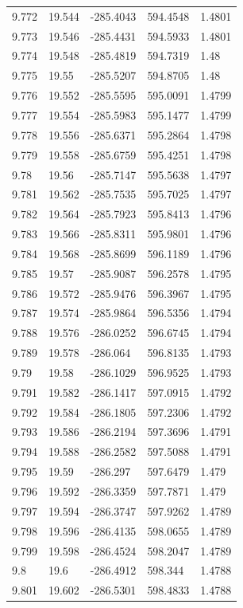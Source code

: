 \begin{tabular}{lllll}
9.772 & 19.544 & -285.4043 & 594.4548 & 1.4801 \\
9.773 & 19.546 & -285.4431 & 594.5933 & 1.4801 \\
9.774 & 19.548 & -285.4819 & 594.7319 & 1.48 \\
9.775 & 19.55 & -285.5207 & 594.8705 & 1.48 \\
9.776 & 19.552 & -285.5595 & 595.0091 & 1.4799 \\
9.777 & 19.554 & -285.5983 & 595.1477 & 1.4799 \\
9.778 & 19.556 & -285.6371 & 595.2864 & 1.4798 \\
9.779 & 19.558 & -285.6759 & 595.4251 & 1.4798 \\
9.78 & 19.56 & -285.7147 & 595.5638 & 1.4797 \\
9.781 & 19.562 & -285.7535 & 595.7025 & 1.4797 \\
9.782 & 19.564 & -285.7923 & 595.8413 & 1.4796 \\
9.783 & 19.566 & -285.8311 & 595.9801 & 1.4796 \\
9.784 & 19.568 & -285.8699 & 596.1189 & 1.4796 \\
9.785 & 19.57 & -285.9087 & 596.2578 & 1.4795 \\
9.786 & 19.572 & -285.9476 & 596.3967 & 1.4795 \\
9.787 & 19.574 & -285.9864 & 596.5356 & 1.4794 \\
9.788 & 19.576 & -286.0252 & 596.6745 & 1.4794 \\
9.789 & 19.578 & -286.064 & 596.8135 & 1.4793 \\
9.79 & 19.58 & -286.1029 & 596.9525 & 1.4793 \\
9.791 & 19.582 & -286.1417 & 597.0915 & 1.4792 \\
9.792 & 19.584 & -286.1805 & 597.2306 & 1.4792 \\
9.793 & 19.586 & -286.2194 & 597.3696 & 1.4791 \\
9.794 & 19.588 & -286.2582 & 597.5088 & 1.4791 \\
9.795 & 19.59 & -286.297 & 597.6479 & 1.479 \\
9.796 & 19.592 & -286.3359 & 597.7871 & 1.479 \\
9.797 & 19.594 & -286.3747 & 597.9262 & 1.4789 \\
9.798 & 19.596 & -286.4135 & 598.0655 & 1.4789 \\
9.799 & 19.598 & -286.4524 & 598.2047 & 1.4789 \\
9.8 & 19.6 & -286.4912 & 598.344 & 1.4788 \\
9.801 & 19.602 & -286.5301 & 598.4833 & 1.4788 \\

\end{tabular}

